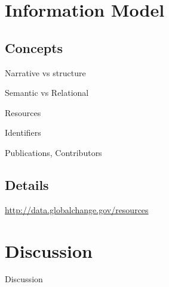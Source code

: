 \documentclass{beamer}
\begin{document}

\section{Information Model}
\subsection{Concepts}
\begin{frame}
    \begin{center}
        \Huge Narrative vs structure
    \end{center}
\end{frame}

\begin{frame}
    \begin{center}
        \Huge Semantic vs Relational
    \end{center}
\end{frame}

\begin{frame}
    \begin{center}
        \Huge Resources
    \end{center}
\end{frame}

\begin{frame}
    \begin{center}
        \Huge Identifiers
    \end{center}
\end{frame}

\begin{frame}
    \begin{center}
        \Huge Publications, Contributors
    \end{center}
\end{frame}

\subsection{Details}
\begin{frame}
    \begin{center}
        \url{http://data.globalchange.gov/resources}
    \end{center}
\end{frame}

\section{Discussion}
\begin{frame}
    \begin{center}
        Discussion
    \end{center}
\end{frame}
\end{document}
